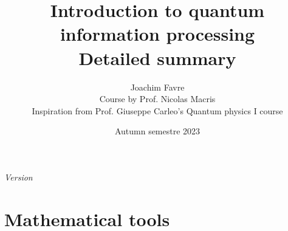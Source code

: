 \documentclass[a4paper]{article}
\title{Introduction to quantum information processing \\ Detailed summary}
\author{Joachim Favre \\ Course by Prof. Nicolas Macris \\ Inspiration from Prof. Giuseppe Carleo's Quantum physics I course}
\date{Autumn semestre 2023}
\begin{document}
\maketitle

\setcounter{tocdepth}{5}

\tableofcontents

\initcurrdate
\def\setdateformat{Y--m--d}
\vspace*{\fill}
\begin{center}
    \textit{Version \printdate}
\end{center}
\vspace*{\fill}
\vspace*{\fill}
\newpage

\section{Mathematical tools}
\end{document}
